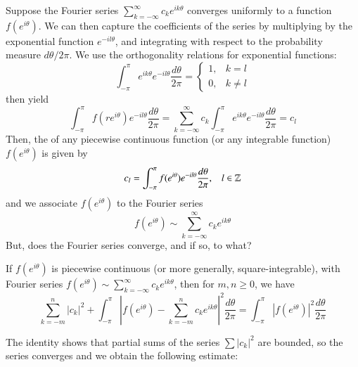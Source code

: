 \documentclass[12pt, a4paper, oneside, openright, titlepage]{book}
\begin{document}
\begin{rmk}
    Suppose the Fourier series $\sum_{k=-\infty}^{\infty}c_ke^{ik\theta}$ converges uniformly to a function $f(e^{i\theta})$. We can then capture the coefficients of the series by multiplying by the exponential function $e^{-il\theta}$, and integrating with respect to the probability measure $d\theta/2\pi$. We use the orthogonality relations for exponential functions: \begin{equation*}
        \int_{-\pi}^{\pi}e^{ik\theta}e^{-il\theta}\frac{d\theta}{2\pi} = \left\{\begin{array}{lc} 1, & k = l \\ 0, & k \neq l \end{array}\right.
    \end{equation*}
    then yield \begin{equation*}
        \int_{-\pi}^{\pi}f(re^{i\theta})e^{-il\theta}\frac{d\theta}{2\pi} = \sum_{k=-\infty}^{\infty}c_k\int_{-\pi}^{\pi}e^{ik\theta}e^{-il\theta}\frac{d\theta}{2\pi} = c_l
    \end{equation*}
    Then, the  of any piecewise continuous function (or any integrable function) $f(e^{i\theta})$ is given by \begin{equation*}
        c_l = \int_{-\pi}^{\pi}f(e^{i\theta})e^{-il\theta}\frac{d\theta}{2\pi},\;\;\;l\in\mathbb Z
    \end{equation*}
    and we associate $f(e^{i\theta})$ to the Fourier series \begin{equation*}
        f(e^{i\theta}) \sim \sum_{k=-\infty}^{\infty}c_ke^{ik\theta}
    \end{equation*}
    But, does the Fourier series converge, and if so, to what?
\end{rmk}

\begin{thm}
    If $f(e^{i\theta})$ is piecewise continuous (or more generally, square-integrable), with Fourier series $f(e^{i\theta}) \sim \sum_{k=-\infty}^{\infty}c_ke^{ik\theta}$, then for $m,n \geq 0$, we have \begin{equation*}
        \sum_{k=-m}^n|c_k|^2 + \int_{-\pi}^{\pi}\left|f(e^{i\theta})-\sum_{k=-m}^nc_ke^{ik\theta}\right|^2\frac{d\theta}{2\pi} = \int_{-\pi}^{\pi}|f(e^{i\theta})|^2\frac{d\theta}{2\pi}
    \end{equation*}
\end{thm}

The identity shows that partial sums of the series $\sum |c_k|^2$ are bounded, so the series converges and we obtain the following estimate:
\end{document}
